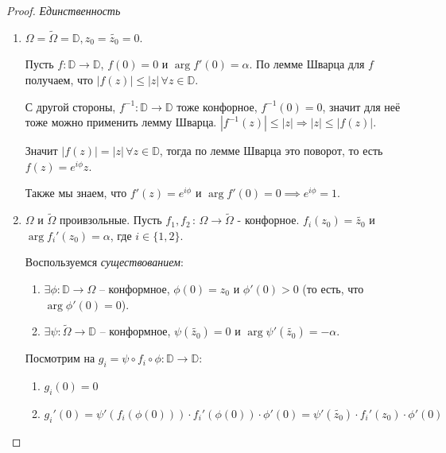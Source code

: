 \begin{proof}
    \textit{Единственность}

    \begin{enumerate}
        \item {
            $\Omega = \tilde{\Omega} = \mathbb{D}, z_0 = \tilde{z_0} = 0$.

            Пусть $f : \mathbb{D} \to \mathbb{D}$, $f(0) = 0$ и $\arg f'(0) = \alpha$.
            По лемме Шварца для $f$ получаем, что $|f(z)| \leqslant |z| \, \forall z \in \mathbb{D}$.
            
            С другой стороны, $f^{-1} : \mathbb{D} \to \mathbb{D}$ тоже конфорное, $f^{-1}(0) = 0$, значит для
            неё тоже можно применить лемму Шварца. $|f^{-1}(z)| \leqslant |z| \Rightarrow |z| \leqslant |f(z)|$.

            Значит $|f(z)| = |z| \, \forall z \in \mathbb{D}$, тогда по лемме Шварца это поворот, то есть $f(z) = e^{i\phi}z$.
            
            Также мы знаем, что $f'(z) = e^{i\phi}$ и $\arg f'(0) = 0 \implies e^{i\phi} = 1$. 
        }
        \item {
            $\Omega$ и $\tilde{\Omega}$ проивзольные. Пусть $f_1, f_2 \, : \, \Omega \to \tilde{\Omega}$ - конфорное.
            $f_i(z_0) = \tilde{z_0}$ и $\arg f_i' (z_0) = \alpha$, где $i \in \{1, 2\}$.

            Воспользуемся \textit{существованием}:
            
            \begin{enumerate}
                \item {
                    $\exists \phi : \mathbb{D} \rightarrow \Omega$ -- конформное, $\phi(0) = z_0$ и $\phi'(0) > 0$ (то есть, что $\arg \phi'(0) = 0$).
                }
                \item {
                    $\exists \psi : \tilde{\Omega} \rightarrow \mathbb{D}$ -- конформное, $\psi(\tilde{z_0}) = 0$ и $\arg \psi'(\tilde{z_0}) = -\alpha$.
                }
            \end{enumerate}

            Посмотрим на $g_i = \psi \circ f_i \circ \phi: \mathbb{D} \rightarrow \mathbb{D}$:

            \begin{enumerate}
                \item $g_i(0) = 0$
                \item {
                    $g_i'(0) = \psi'(f_i(\phi(0))) \cdot f_i'(\phi(0)) \cdot \phi'(0) = \psi'(\tilde{z_0}) \cdot f_i'(z_0) \cdot\phi'(0)$

}
\end{enumerate}}
\end{enumerate}
\end{proof}
